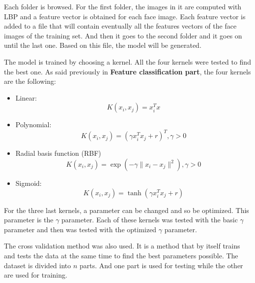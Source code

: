 \noindent Each folder is browsed. For the first folder, the images in it are computed with LBP and a feature vector is obtained for each face image. Each feature vector is added to a file that will contain eventually all the features vectors of the face images of the training set. And then it goes to the second folder and it goes on until the last one. Based on this file, the model will be generated.
\newline

\noindent The model is trained by choosing a kernel. All the four kernels were tested to find the best one. As said previously in \textbf{\color{red}Feature classification part}, the four kernels are the following:

\begin{itemize}
  \item Linear:
  \begin{equation}
K(x_i,x_j) = x_i^Tx
\end{equation}

  \item Polynomial:
  \begin{equation}
K(x_i,x_j) = (\gamma x_i^Tx_j + r)^T, \gamma > 0
\end{equation}

  \item Radial basis function (RBF)
  \begin{equation}
K(x_i,x_j) = \exp(-\gamma \| x_i - x_j \|^2), \gamma > 0
\end{equation}

  \item Sigmoid:
  \begin{equation}
K(x_i,x_j) = \tanh(\gamma x_i^T x_j + r)
\end{equation}
\end{itemize}

\vspace{\baselineskip}
\noindent For the three last kernels, a parameter can be changed and so be optimized. This parameter is the $ \gamma $ parameter. Each of these kernels was tested with the basic $ \gamma $ parameter and then was tested with the optimized $ \gamma $ parameter.
\newline

\noindent The cross validation method was also used. It is a method that by itself trains and tests the data at the same time to find the best parameters possible. The dataset is divided into $ n $ parts. And one part is used for testing while the other are used for training.
\newline






